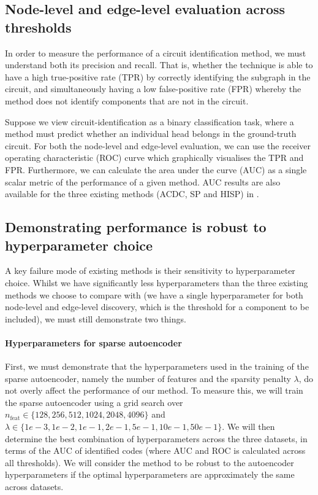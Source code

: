 \documentclass[11pt]{scrartcl}
\begin{document}
\subsection{Node-level and edge-level evaluation across thresholds}

In order to measure the performance of a circuit identification method, we must understand both its precision and recall. That is, whether the technique is able to have a high true-positive rate (TPR) by correctly identifying the subgraph in the circuit, and simultaneously having a low false-positive rate (FPR) whereby the method does not identify components that are not in the circuit. 

Suppose we view circuit-identification as a binary classification task, where a method must predict whether an individual head belongs in the ground-truth circuit. For both the node-level and edge-level evaluation, we can use the receiver operating characteristic (ROC) curve which graphically visualises the TPR and FPR. Furthermore, we can calculate the area under the curve (AUC) as a single scalar metric of the performance of a given method. AUC results are also available for the three existing methods (ACDC, SP and HISP) in \citet{conmy2024towards}.


\subsection{Demonstrating performance is robust to hyperparameter choice}

A key failure mode of existing methods is their sensitivity to hyperparameter choice. Whilst we have significantly less hyperparameters than the three existing methods we choose to compare with (we have a single hyperparameter for both node-level and edge-level discovery, which is the threshold for a component to be included), we must still demonstrate two things. 

\paragraph{Hyperparameters for sparse autoencoder}
First, we must demonstrate that the hyperparameters used in the training of the sparse autoencoder, namely the number of features and the sparsity penalty $\lambda$, do not overly affect the performance of our method. To measure this, we will train the sparse autoencoder using a grid search over $n_\text{feat} \in \{128, 256, 512, 1024, 2048, 4096\}$ and $\lambda \in \{1e-3, 1e-2, 1e-1, 2e-1, 5e-1, 10e-1, 50e-1\}$. We will then determine the best combination of hyperparameters across the three datasets, in terms of the AUC of identified codes (where AUC and ROC is calculated across all thresholds). We will consider the method to be robust to the autoencoder hyperparameters if the optimal hyperparameters are approximately the same across datasets.
\end{document}
